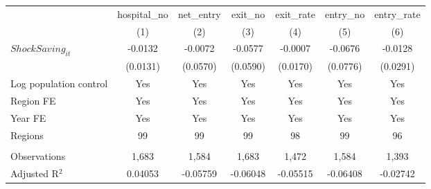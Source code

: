 \begingroup
\centering
\begin{tabular}{lcccccc}
   \toprule
                          & hospital\_no  & net\_entry  & exit\_no  & exit\_rate  & entry\_no  & entry\_rate \\    
                          & (1)           & (2)         & (3)       & (4)         & (5)        & (6)\\  
   \midrule 
   $ShockSaving_{it}$     & -0.0132       & -0.0072     & -0.0577   & -0.0007     & -0.0676    & -0.0128\\   
                          & (0.0131)      & (0.0570)    & (0.0590)  & (0.0170)    & (0.0776)   & (0.0291)\\   
   Log population control & Yes           & Yes         & Yes       & Yes         & Yes        & Yes\\  
   Region FE              & Yes           & Yes         & Yes       & Yes         & Yes        & Yes\\  
   Year FE                & Yes           & Yes         & Yes       & Yes         & Yes        & Yes\\  
   Regions                & 99            & 99          & 99        & 98          & 99         & 96\\  
    \\
   Observations           & 1,683         & 1,584       & 1,683     & 1,472       & 1,584      & 1,393\\  
   Adjusted R$^2$         & 0.04053       & -0.05759    & -0.06048  & -0.05515    & -0.06408   & -0.02742\\  
   \bottomrule
\end{tabular}
\par\endgroup

